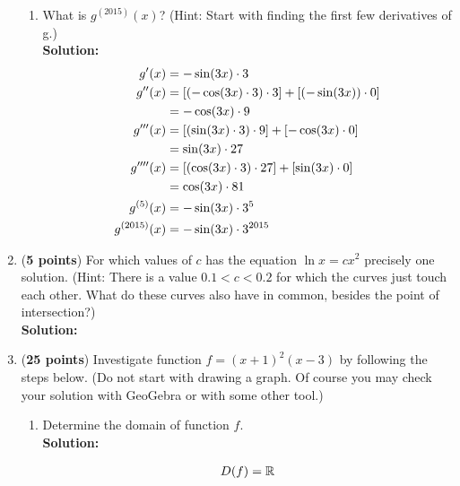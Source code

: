 \documentclass[a4paper]{article}
\begin{document}
\begin{enumerate}
\begin{enumerate}
	
	
	\item What is $g^{(2015)}(x)$? (Hint: Start with finding the first few derivatives of g.)\\
	\textbf{Solution:}\\
	
\begin{align*}
	g'(x) &= -\sin(3x) \cdot 3\notag\\
	g''(x) &= \left[ (-\cos(3x) \cdot 3) \cdot 3\right] + \left[ (-\sin(3x)) \cdot 0 \right]\notag\\
	&= -\cos(3x) \cdot 9\notag\\
	g'''(x) &= \left[ (\sin(3x) \cdot 3) \cdot 9 \right] + \left[ -\cos(3x) \cdot 0\right]\notag\\
	&= \sin(3x) \cdot 27\notag\\
	g''''(x) &= \left[ (\cos(3x) \cdot 3) \cdot 27\right] + \left[ \sin(3x) \cdot 0 \right]\notag\\
	&= \cos(3x) \cdot 81\notag\\
	g^{(5)}(x) &= -\sin(3x) \cdot 3^5\notag\\
	g^{(2015)}(x) &= -\sin(3x) \cdot 3^{2015}\notag
\end{align*}	
	
	
	
	
\end{enumerate}


\item (\textbf{5 points}) For which values of $c$ has the equation $\ln x = cx^2$ precisely one solution. (Hint: There is a value $0.1 < c < 0.2$ for which the curves just touch each other. What do these curves also have in common, besides the point of intersection?)\\
\textbf{Solution:}




\item (\textbf{25 points}) Investigate function $f = (x+1)^2(x-3)$ by following the steps below. (Do not start with drawing a graph. Of course you may check your solution with GeoGebra or with some other tool.)

\begin{enumerate}
	\item Determine the domain of function $f$.\\
	\textbf{Solution:}
		
\begin{align}
	D(f) = \mathbb{R}\notag
\end{align}		
\vspace{1em}		
		

\end{enumerate}
\end{enumerate}
\end{document}
